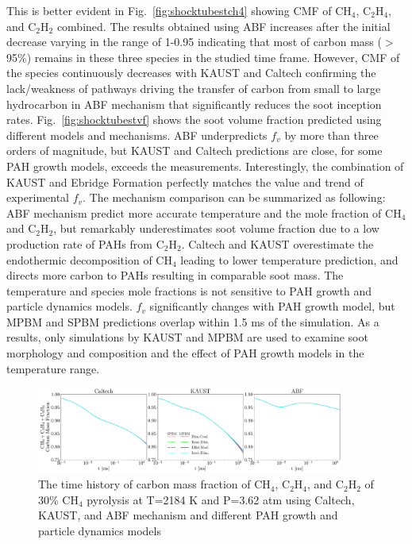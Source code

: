 This is better evident in Fig.~\ref{fig:shocktubestch4} showing CMF of $\mathrm{CH_4}$, $\mathrm{C_2H_4}$, and $\mathrm{C_2H_2}$ combined. The results obtained using ABF increases after the initial decrease varying in the range of 1-0.95 indicating that most of carbon mass ($>$95\%) remains in these three species in the studied time frame. However, CMF of the species continuously decreases with KAUST and Caltech confirming the lack/weakness of pathways driving the transfer of carbon from small to large hydrocarbon in ABF mechanism that significantly reduces the soot inception rates. Fig.~\ref{fig:shocktubestvf} shows the soot volume fraction predicted using different models and mechanisms. ABF underpredicts $f_v$ by more than three orders of magnitude, but KAUST and Caltech predictions are close, for some PAH growth models, exceeds the measurements. Interestingly, the combination of KAUST and Ebridge Formation perfectly matches the value and trend of experimental $f_v$. The mechanism comparison can be summarized as following: ABF mechanism predict more accurate temperature and the mole fraction of $\mathrm{CH_4}$ and $\mathrm{C_2H_2}$, but remarkably underestimates soot volume fraction due to a low production rate of PAHs from $\mathrm{C_2H_2}$. Caltech and KAUST overestimate the endothermic decomposition of $\mathrm{CH_4}$ leading to lower temperature prediction, and directs more carbon to PAHs resulting in comparable soot mass. The temperature and species mole fractions is not sensitive to PAH growth and particle dynamics models. $f_v$ significantly changes with PAH growth model, but MPBM and SPBM predictions overlap within 1.5 ms of the simulation. As a results, only simulations by KAUST and MPBM are used to examine soot morphology and composition and the effect of PAH growth models in the temperature range. 

\begin{figure}[H]
	\centering
	\includegraphics[width=0.9\textwidth]{Figures/Results/Shocktube/Stanford/june/stsh_mech_compare_CCC.pdf}
	\caption{The time history of carbon mass fraction of $\mathrm{CH_4}$, $\mathrm{C_2H_4}$, and $\mathrm{C_2H_2}$ of 30\% $\mathrm{CH_4}$ pyrolysis at T=2184 K and P=3.62 atm using Caltech, KAUST, and ABF mechanism and different PAH growth and particle dynamics models}
	\label{fig:shocktubestccc} 
\end{figure}


